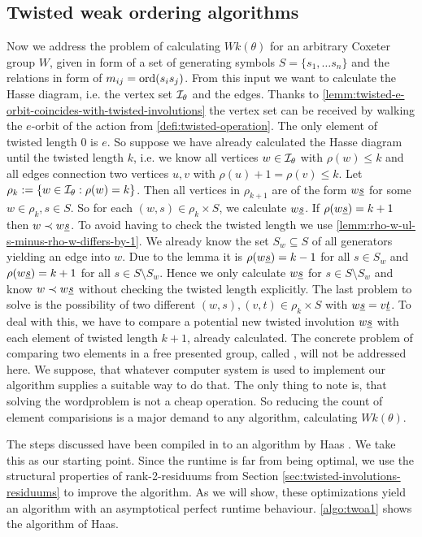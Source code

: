 \subsection{Twisted weak ordering algorithms}
\label{sec:twisted-involutions-algorithms}

Now we address the problem of calculating $Wk(\theta)$ for an arbitrary Coxeter group $W$, given in form of a set of generating symbols $S = \{s_1, \ldots s_n\}$ and the relations in form of $m_{ij} = \operatorname{ord}(s_i s_j)$. From this input we want to calculate the Hasse diagram, i.e. the vertex set $\mathcal{I}_{\theta}$ and the edges. Thanks to \ref{lemm:twisted-e-orbit-coincides-with-twisted-involutions} the vertex set can be received by walking the $e$-orbit of the action from \ref{defi:twisted-operation}. The only element of twisted length 0 is $e$. So suppose we have already calculated the Hasse diagram until the twisted length $k$, i.e. we know all vertices $w \in \mathcal{I}_{\theta}$ with $\rho(w) \leq k$ and all edges connection two vertices $u,v$ with $\rho(u) + 1 = \rho(v) \leq k$. Let $\rho_k := \{ w \in \mathcal{I}_{\theta} : \rho(w) = k \}$. Then all vertices in $\rho_{k+1}$ are of the form $w \underline{s}$ for some $w \in \rho_k, s \in S$. So for each $(w,s) \in \rho_k \times S$, we calculate $w \underline{s}$. If $\rho(w \underline{s}) = k + 1$ then $w \prec w \underline{s}$. To avoid having to check the twisted length we use \ref{lemm:rho-w-ul-s-minus-rho-w-differs-by-1}. We already know the set $S_w \subseteq S$ of all generators yielding an edge into $w$. Due to the lemma it is $\rho(w \underline{s}) = k - 1$ for all $s \in S_w$ and $\rho(w \underline{s}) = k + 1$ for all $s \in S \setminus S_w$. Hence we only calculate $w \underline{s}$ for $s \in S \setminus S_w$ and know $w \prec w \underline{s}$ without checking the twisted length explicitly. The last problem to solve is the possibility of two different $(w,s),(v,t) \in \rho_k \times S$ with $w \underline{s} = v \underline{t}$. To deal with this, we have to compare a potential new twisted involution $w \underline{s}$ with each element of twisted length $k+1$, already calculated. The concrete problem of comparing two elements in a free presented group, called , will not be addressed here. We suppose, that whatever computer system is used to implement our algorithm supplies a suitable way to do that. The only thing to note is, that solving the wordproblem is not a cheap operation. So reducing the count of element comparisions is a major demand to any algorithm, calculating $Wk(\theta)$.

The steps discussed have been compiled in to an algorithm by Haas \cite[Algorithm 3.1.1]{haas:twoa}. We take this as our starting point. Since the runtime is far from being optimal, we use the structural properties of rank-2-residuums from Section \ref{sec:twisted-involutions-residuums} to improve the algorithm. As we will show, these optimizations yield an algorithm with an asymptotical perfect runtime behaviour. \ref{algo:twoa1} shows the algorithm of Haas.

